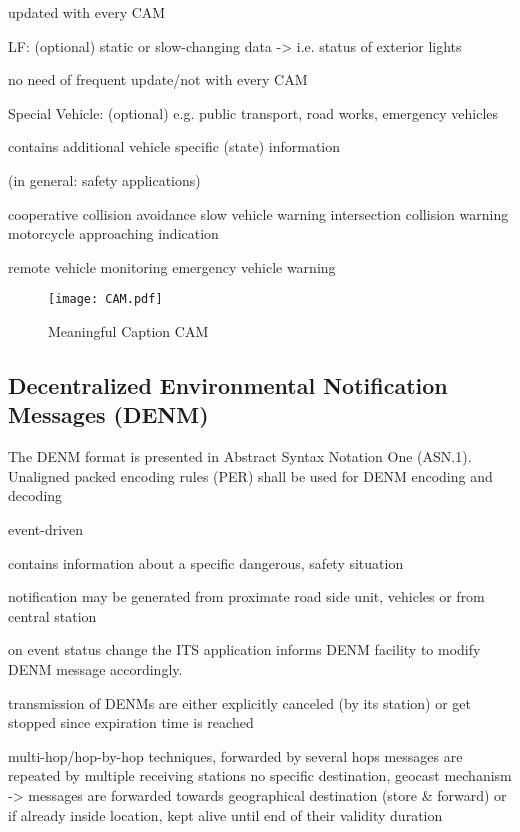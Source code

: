     updated with every CAM
    
LF: (optional)
    static or slow-changing data  -> i.e. status of exterior lights

    no need of frequent update/not with every CAM

Special Vehicle: (optional)
    e.g. public transport, road works, emergency vehicles
    
    contains additional vehicle specific (state) information


(in general: safety applications)

cooperative collision avoidance
slow vehicle warning
intersection collision warning
motorcycle approaching indication

remote vehicle monitoring
emergency vehicle warning


\begin{figure}[H]
    \centering
    \texttt{[image: CAM.pdf]}
    \caption{Meaningful Caption CAM}
    \label{fig:cam-structure}
\end{figure}

\subsection{Decentralized Environmental Notification Messages (DENM)}

The DENM format is presented in Abstract Syntax Notation One (ASN.1).
Unaligned packed encoding rules (PER) shall be used for DENM encoding and decoding


event-driven

contains information about a specific dangerous, safety situation

notification may be generated from proximate road side unit, vehicles or from central station


on event status change the ITS application informs DENM facility to modify DENM message accordingly.

transmission of DENMs are either explicitly canceled (by its station) or get stopped since expiration time is reached







multi-hop/hop-by-hop techniques, forwarded by several hops
messages are repeated by multiple receiving stations
no specific destination, geocast mechanism 
    -> messages are forwarded towards geographical destination (store \& forward)
        or if already inside location, kept alive until end of their validity duration

